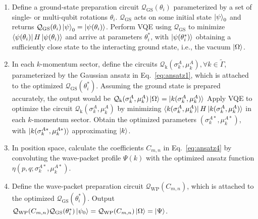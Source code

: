 \documentclass[a4paper,onecolumn,11pt,accepted=2024-10-11]{quantumarticle}
\begin{document}
\begin{enumerate}
    \item Define a ground-state preparation circuit $\mathcal{Q}_{\text{GS}}(\theta_i)$ parameterized by a set of single- or multi-qubit rotations $\theta_i$. $\mathcal{Q}_{\text{GS}}$ acts on some initial state $\ket{\psi}_0$ and returns $\mathcal{Q}_{\text{GS}}(\theta_i)\ket{\psi}_0=\ket{\psi(\theta_i)}$.
    Perform VQE using $\mathcal{Q}_{\text{GS}}$ to minimize $\bra{\psi(\theta_i)}H\ket{\psi(\theta_i)}$ and arrive at parameters $\theta_i^{*}$, with $\ket{\psi(\theta_i^{*})}$ obtaining a sufficiently close state to the interacting ground state, i.e., the vacuum $\ket{\Omega}$.
    \item In each $k$-momentum sector, define the circuits $\mathcal{Q}_{\text{k}}(\sigma_k^A,\mu_k^A), \forall k\in\widetilde{\Gamma}$, parameterized by the Gaussian ansatz in Eq.~\eqref{eq:ansatz1}, which is attached to the optimized $\mathcal{Q}_{\text{GS}}(\theta_i^{*})$. Assuming the ground state is prepared accurately, the output would be $\mathcal{Q}_{\text{k}}(\sigma_k^A,\mu_k^A)\ket{\Omega} = \ket{k(\sigma_k^A,\mu_k^A)}$
    Apply VQE to optimize the circuit $\mathcal{Q}_{\text{k}}(\sigma_k^A,\mu_k^A)$ by minimizing $\bra{k(\sigma_k^A,\mu_k^A)}H\ket{k(\sigma_k^A,\mu_k^A)}$ in each $k$-momentum sector.
    Obtain the optimized parameters $(\sigma_k^{A*},\mu_k^{A*})$, with $\ket{k(\sigma_k^{A*},\mu_k^{A*})}$ approximating $\ket{k}$.
    \item In position space, calculate the coefficients $C_{m,n}$ in Eq.~\eqref{eq:ansatz4} by convoluting the wave-packet profile $\Psi(k)$ with the optimized ansatz function $\eta(p,q;\sigma_k^{A*},\mu_k^{A*})$.
    \item Define the wave-packet preparation circuit $\mathcal{Q}_{\text{WP}}(C_{m,n})$, which is attached to the optimized $\mathcal{Q}_{\text{GS}}(\theta_i^{*})$. Output $\mathcal{Q}_{\text{WP}}(C_{m,n})\mathcal{Q}_{\text{GS}}(\theta_i^{*})\ket{\psi_0}=\mathcal{Q}_{\text{WP}}(C_{m,n})\ket{\Omega}=\ket{\Psi}$.
\end{enumerate}
%
\end{document}
